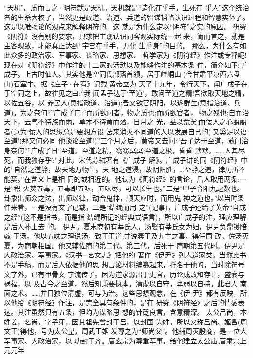\documentclass[12pt,UTF8]{ctexbook}
\begin{document}
“天机”。质而言之·阴符就是天机。天机就是“造化在乎手，生死在
乎人”这个统治者的生杀大权了，当然更是政道、治道、兵道的智谋韬略认识过程和智慧实体了。这是以唯物论的观点来解释阴符的。这
就是为什么定以“阴符”之实的原因。
研究《阴符》没有别的要求，只求把主观认识同客观实际统一起
来，简而言之，就是主客观致，才能真正达到“宇宙在乎手，万化
生乎身”的目的。
那么，为什么有如此众多的政治家、军事家、谋略家、思想家、
哲学家为《阴符经》作注或专释呢!
现在对《阴符经》中作注的十二家的活动以及能够作注的基本条
件，简介如下:
广成子。上古时仙人。其实他是空同氏部落首领，居于崆峒山
(今甘肃平凉西六盘山)石室中。据《庄子·在宥》记载:黄帝立为
天了十九年，令行天下，闻广成子在于空同之上，故往见之曰:“我
闻孟子达于‘至道’，敢问至道之精!吾欲取天地之精，以佐五谷，以
养民人(意指政道、治道);吾又欲官阴阳，以遂群生(意指治道、兵
道)。为之奈何?”广成子曰:“而所欲问者，物之质也;而所欲官者，
物之残也;自而治天下，云气不待族而雨，草木不待黄而落，日月之
光，益以荒矣;而佞人之心翦翦者(意为:佞人的思想总是要想方设
法来消灭不同道的人以发展自己的).又奚足以语至道!(那又何必同
他谈论至道!)”三个月之后，黄帝又去问:“吾子达于至道，敢问治
身奈何?”广成子日“至道。至道之精，窈窈冥冥;至道之极，昏昏
默默。……人其尽死，而我独存乎?”对此，宋代苏轼著有《广成子
解》。广成子讲的同《阴符经》中的“自然之道静，故天地万物生。天
地之道浸，故阴阳胜，…至静之道，律历所不能契。”在含义上是相
同的或相近的。他认为《阴符经》的言论，后人取用两条:一是“积
火焚五毒，五毒即五味，五味尽，可以长生也。”二是“甲子合阳九之数也。卦象出师众之法，出师以律，动合鬼神，顺天应时，而用鬼
神之道也。”以当时条件来看，一是没有文字记载，二是“结绳而用
之”(记事)，广成子还给了黄帝“自成之经”(这不是指书，而是指
结绳所记的经典式语言)，所以广成子的注，理应理解是后人补上去
的。
伊尹。夏末商初有莘氏人，汤娶有莘氏女为妇，伊尹负鼎镬陪嫁
于汤。他以五味之理说汤，致于王道;并说素王及九主之事，得任国
政，佐汤灭夏，为商朝相国。他又辅佐商的第二代、第三代，后死于
商朝第五代时。伊尹是大政治家、军事家。《汉书·艺文志》把他的
著作《伊尹》列人道家类。当然此书不是手稿，而是后人依据他的思
想言论材料编纂起来，托名于他的，当时除符号文字外，已有甲骨文
字流传了。因为道家源出于史官，历论成败和存亡，盛衰与祸福，以
及古今之至道，然后知秉要执本，清虚以自守，卑弱以自持，此君人
南面之术。……并日独位清虚，可与为治。这些思想观念，在《伊
尹》都有反映，所以他给《阴符经》作注，是完全具有条件的，是在
研究《阴符经》之后的情感表达。其注虽然只有五条，但均为谋略思
想的针砭良言，含意精深。
太公吕尚，本姓姜，名尚，字子牙，因其祖先曾封于吕，以封国
为姓，所以又称吕尚。姬昌(周文王)得他，号为太公望，周武王姬
发尊之为“师尚父”。他辅周灭殷商，是一位大军事家、大政治家，以
功封于齐。唐玄宗为尊重军事，给他建立太公庙;唐肃宗上元元年
\end{document}
